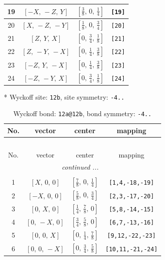 \documentclass[fleqn,8pt]{jsarticle}
\begin{document}
\begin{longtable}{cccc}
19 & $\left[ - X,\, - Z,\, Y \right]$ & $\left[ \frac{3}{8},\, 0,\, \frac{1}{4} \right]$ & {\tt [19]} \\ \hline
20 & $\left[ X,\, - Z,\, - Y \right]$ & $\left[ \frac{1}{8},\, 0,\, \frac{3}{4} \right]$ & {\tt [20]} \\ \hline
21 & $\left[ Z,\, Y,\, X \right]$ & $\left[ 0,\, \frac{3}{4},\, \frac{1}{8} \right]$ & {\tt [21]} \\ \hline
22 & $\left[ Z,\, - Y,\, - X \right]$ & $\left[ 0,\, \frac{1}{4},\, \frac{3}{8} \right]$ & {\tt [22]} \\ \hline
23 & $\left[ - Z,\, Y,\, - X \right]$ & $\left[ 0,\, \frac{1}{4},\, \frac{3}{8} \right]$ & {\tt [23]} \\ \hline
24 & $\left[ - Z,\, - Y,\, X \right]$ & $\left[ 0,\, \frac{3}{4},\, \frac{1}{8} \right]$ & {\tt [24]} \\
\end{longtable}
* Wyckoff site: {\tt 12b}, site symmetry: {\tt -4..}
\renewcommand{\arraystretch}{1.2}
\begin{longtable}{cccc}
\caption{Wyckoff bond: {\tt 12a@12b}, bond symmetry: {\tt -4..}}
 \\
 \hline \hline
No. & vector & center & mapping \\ \hline \endfirsthead

\multicolumn{3}{l}{\tablename\ \thetable{}} \\
 \hline \hline
No. & vector & center & mapping \\ \hline \endhead

 \hline \hline
\multicolumn{3}{r}{\footnotesize\it continued ...} \\ \endfoot

 \hline \hline
\multicolumn{3}{r}{} \\ \endlastfoot

1 & $\left[ X,\, 0,\, 0 \right]$ & $\left[ \frac{7}{8},\, 0,\, \frac{1}{4} \right]$ & {\tt [1,4,-18,-19]} \\ \hline
2 & $\left[ - X,\, 0,\, 0 \right]$ & $\left[ \frac{5}{8},\, 0,\, \frac{3}{4} \right]$ & {\tt [2,3,-17,-20]} \\ \hline
3 & $\left[ 0,\, X,\, 0 \right]$ & $\left[ \frac{1}{4},\, \frac{7}{8},\, 0 \right]$ & {\tt [5,8,-14,-15]} \\ \hline
4 & $\left[ 0,\, - X,\, 0 \right]$ & $\left[ \frac{3}{4},\, \frac{5}{8},\, 0 \right]$ & {\tt [6,7,-13,-16]} \\ \hline
5 & $\left[ 0,\, 0,\, X \right]$ & $\left[ 0,\, \frac{1}{4},\, \frac{7}{8} \right]$ & {\tt [9,12,-22,-23]} \\ \hline
6 & $\left[ 0,\, 0,\, - X \right]$ & $\left[ 0,\, \frac{3}{4},\, \frac{5}{8} \right]$ & {\tt [10,11,-21,-24]} \\
\end{longtable}
\end{document}
